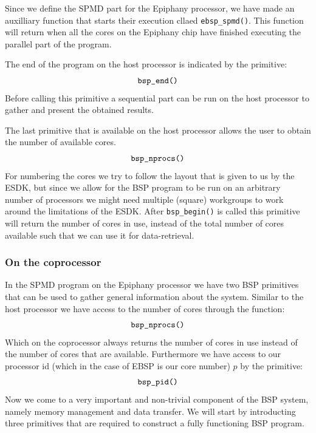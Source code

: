\documentclass[fleqn]{article}
\renewcommand{\(}{\left(}
\renewcommand{\)}{\right)}
\begin{document}
Since we define the SPMD part for the Epiphany processor, we have made an auxilliary function that starts their execution cllaed \verb.ebsp_spmd().. This function will return when all the cores on the Epiphany chip have finished executing the parallel part of the program. 

The end of the program on the host processor is indicated by the primitive:
\begin{equation}
    \verb.bsp_end(). 
\end{equation}
Before calling this primitive a sequential part can be run on the host processor to gather and present the obtained results.

The last primitive that is available on the host processor allows the user to obtain the number of available cores. 
\begin{equation}
    \verb.bsp_nprocs(). 
\end{equation}
For numbering the cores we try to follow the layout that is given to us by the ESDK, but since we allow for the BSP program to be run on an arbitrary number of processors we might need multiple (square) workgroups to work around the limitations of the ESDK. After \verb.bsp_begin(). is called this primitive will return the number of cores in use, instead of the total number of cores available such that we can use it for data-retrieval.

\subsubsection{On the coprocessor}

In the SPMD program on the Epiphany processor we have two BSP primitives that can be used to gather general information about the system. Similar to the host processor we have access to the number of cores through the function:
\begin{equation}
    \verb.bsp_nprocs(). 
\end{equation}
Which on the coprocessor always returns the number of cores in use instead of the number of cores that are available. Furthermore we have access to our processor id (which in the case of EBSP is our core number) $p$ by the primitive:
\begin{equation}
    \verb.bsp_pid(). 
\end{equation}
Now we come to a very important and non-trivial component of the BSP system, namely memory management and data transfer. We will start by introducting three primitives that are required to construct a fully functioning BSP program.
\end{document}
